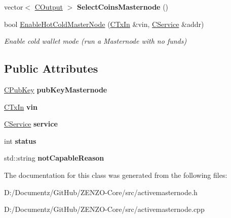 \begin{DoxyCompactItemize}
\mbox{\label{class_c_active_masternode_ac4fc5fb1681bf0a0f3d30e706fb0577a}} 
vector$<$ \mbox{\hyperlink{class_c_output}{C\+Output}} $>$ {\bfseries Select\+Coins\+Masternode} ()
\item 
\mbox{\label{class_c_active_masternode_a2ab446c7b350b9971089c27f83b9ebb0}} 
bool \mbox{\hyperlink{class_c_active_masternode_a2ab446c7b350b9971089c27f83b9ebb0}{Enable\+Hot\+Cold\+Master\+Node}} (\mbox{\hyperlink{class_c_tx_in}{C\+Tx\+In}} \&vin, \mbox{\hyperlink{class_c_service}{C\+Service}} \&addr)
\begin{DoxyCompactList}\small\item\em Enable cold wallet mode (run a Masternode with no funds) \end{DoxyCompactList}\end{DoxyCompactItemize}
\subsection*{Public Attributes}
\begin{DoxyCompactItemize}
\item 
\mbox{\label{class_c_active_masternode_a005f6d9c1e40efd38ab5ceddcb56628b}} 
\mbox{\hyperlink{class_c_pub_key}{C\+Pub\+Key}} {\bfseries pub\+Key\+Masternode}
\item 
\mbox{\label{class_c_active_masternode_a0fe32edc638ebd2866dda14fd490d78e}} 
\mbox{\hyperlink{class_c_tx_in}{C\+Tx\+In}} {\bfseries vin}
\item 
\mbox{\label{class_c_active_masternode_a5b990857c9dc1005d0c134c608474c8f}} 
\mbox{\hyperlink{class_c_service}{C\+Service}} {\bfseries service}
\item 
\mbox{\label{class_c_active_masternode_af43fe0c6da3192458ddc827ff2e0294c}} 
int {\bfseries status}
\item 
\mbox{\label{class_c_active_masternode_a9f70460608657fcbda659b650e2180cd}} 
std\+::string {\bfseries not\+Capable\+Reason}
\end{DoxyCompactItemize}


The documentation for this class was generated from the following files\+:\begin{DoxyCompactItemize}
\item 
D\+:/\+Documentz/\+Git\+Hub/\+Z\+E\+N\+Z\+O-\/\+Core/src/activemasternode.\+h\item 
D\+:/\+Documentz/\+Git\+Hub/\+Z\+E\+N\+Z\+O-\/\+Core/src/activemasternode.\+cpp\end{DoxyCompactItemize}

